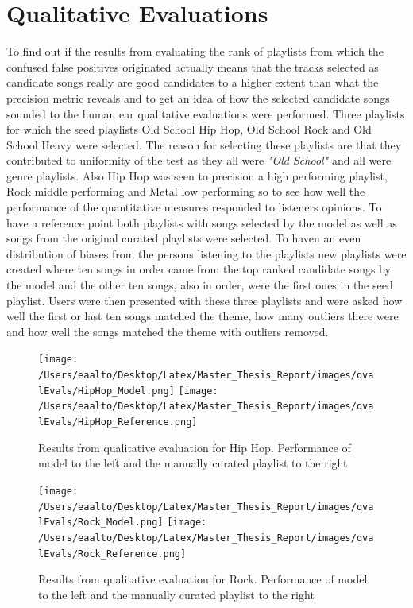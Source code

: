 \documentclass[a4paper,11pt]{kth-mag}
\begin{document}
\section{Qualitative Evaluations}
To find out if the results from evaluating the rank of playlists from which the confused false positives originated actually means that the tracks selected as candidate songs really are good candidates to a higher extent than what the precision metric reveals and to get an idea of how the selected candidate songs sounded to the human ear qualitative evaluations were performed. Three playlists for which the seed playlists Old School Hip Hop, Old School Rock and Old School Heavy were selected. The reason for selecting these playlists are that they contributed to uniformity of the test as they all were \textit{"Old School"} and all were genre playlists. Also Hip Hop was seen to precision a high performing playlist, Rock middle performing and Metal low performing so to see how well the performance of the quantitative measures responded to listeners opinions. To have a reference point both playlists with songs selected by the model as well as songs from the original curated playlists were selected. To haven an even distribution of biases from the persons listening to the playlists new playlists were created where ten songs in order came from the top ranked candidate songs by the model and the other ten songs, also in order, were the first ones in the seed playlist. Users were then presented with these three playlists and were asked how well the first or last ten songs matched the theme, how many outliers there were and how well the songs matched the theme with outliers removed.

\begin{figure}
\texttt{[image: /Users/eaalto/Desktop/Latex/Master\_Thesis\_Report/images/qvalEvals/HipHop\_Model.png]}
\texttt{[image: /Users/eaalto/Desktop/Latex/Master\_Thesis\_Report/images/qvalEvals/HipHop\_Reference.png]}
\caption{Results from qualitative evaluation for Hip Hop. Performance of model to the left and the manually curated playlist to the right}
\end{figure}

\begin{figure}
\texttt{[image: /Users/eaalto/Desktop/Latex/Master\_Thesis\_Report/images/qvalEvals/Rock\_Model.png]}
\texttt{[image: /Users/eaalto/Desktop/Latex/Master\_Thesis\_Report/images/qvalEvals/Rock\_Reference.png]}
\caption{Results from qualitative evaluation for Rock. Performance of model to the left and the manually curated playlist to the right}
\end{figure}
\end{document}

